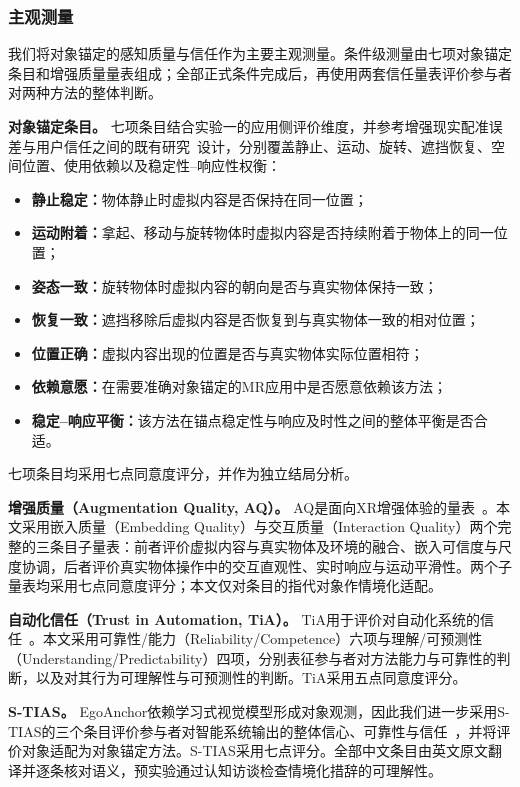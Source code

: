 \documentclass[review]{vgtc}
\begin{document}
\subsubsection{主观测量}

我们将对象锚定的感知质量与信任作为主要主观测量。条件级测量由七项对象锚定条目和增强质量量表组成；全部正式条件完成后，再使用两套信任量表评价参与者对两种方法的整体判断。

\textbf{对象锚定条目。}
七项条目结合实验一的应用侧评价维度，并参考增强现实配准误差与用户信任之间的既有研究~\cite{gottsacker2024artrust}设计，分别覆盖静止、运动、旋转、遮挡恢复、空间位置、使用依赖以及稳定性--响应性权衡：
\begin{itemize}[leftmargin=1.6em,itemsep=1pt,topsep=2pt]
  \item \textbf{静止稳定：}物体静止时虚拟内容是否保持在同一位置；
  \item \textbf{运动附着：}拿起、移动与旋转物体时虚拟内容是否持续附着于物体上的同一位置；
  \item \textbf{姿态一致：}旋转物体时虚拟内容的朝向是否与真实物体保持一致；
  \item \textbf{恢复一致：}遮挡移除后虚拟内容是否恢复到与真实物体一致的相对位置；
  \item \textbf{位置正确：}虚拟内容出现的位置是否与真实物体实际位置相符；
  \item \textbf{依赖意愿：}在需要准确对象锚定的MR应用中是否愿意依赖该方法；
  \item \textbf{稳定--响应平衡：}该方法在锚点稳定性与响应及时性之间的整体平衡是否合适。
\end{itemize}
七项条目均采用七点同意度评分，并作为独立结局分析。

\textbf{增强质量（Augmentation Quality, AQ）。}
AQ是面向XR增强体验的量表~\cite{schein2025aq}。本文采用嵌入质量（Embedding Quality）与交互质量（Interaction Quality）两个完整的三条目子量表：前者评价虚拟内容与真实物体及环境的融合、嵌入可信度与尺度协调，后者评价真实物体操作中的交互直观性、实时响应与运动平滑性。两个子量表均采用七点同意度评分；本文仅对条目的指代对象作情境化适配。

\textbf{自动化信任（Trust in Automation, TiA）。}
TiA用于评价对自动化系统的信任~\cite{koerber2019tia}。本文采用可靠性/能力（Reliability/Competence）六项与理解/可预测性（Understanding/Predictability）四项，分别表征参与者对方法能力与可靠性的判断，以及对其行为可理解性与可预测性的判断。TiA采用五点同意度评分。

\textbf{S-TIAS。}
EgoAnchor依赖学习式视觉模型形成对象观测，因此我们进一步采用S-TIAS的三个条目评价参与者对智能系统输出的整体信心、可靠性与信任~\cite{mcgrath2025stias}，并将评价对象适配为对象锚定方法。S-TIAS采用七点评分。全部中文条目由英文原文翻译并逐条核对语义，预实验通过认知访谈检查情境化措辞的可理解性。
\end{document}
